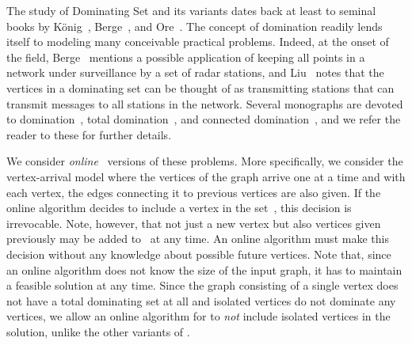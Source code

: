 The study of Dominating Set and its variants dates back at least to
seminal books by K\"{o}nig~\cite{K50}, Berge~\cite{B62}, and Ore~\cite{O62}.
The concept of domination readily lends itself to
modeling many conceivable practical problems.
Indeed, at the onset of the field,
Berge~\cite{B62} mentions a possible application of keeping all points in a
network under surveillance by a set of radar stations, and Liu~\cite{L68}
notes that the vertices in a dominating set can be thought
of as transmitting stations that can transmit messages to all stations
in the network. Several monographs are devoted to domination~\cite{HHS98},
total domination~\cite{HY13}, and connected domination~\cite{DW13}, and we
refer the reader to these for further details.

We consider \emph{online}~\cite{BE98b} versions of these problems.
More specifically, we consider the vertex-arrival model where the vertices
of the
graph arrive one at a time and with each vertex, the edges connecting
it to previous vertices are also given. 
If the online algorithm decides to include a vertex in the set~,
this decision is irrevocable.
Note, however, that not just a new vertex but also vertices given
previously may be added to~ at any time.
An online algorithm must make this decision without
any knowledge about possible future vertices.
Note that, since an online algorithm does not know the size of the
input graph, it has to maintain a feasible solution at any time.
Since the graph consisting of 
a single vertex does not have a total dominating set at all and
isolated vertices do not dominate any vertices, we allow an online 
algorithm for \tds to \emph{not} include isolated vertices in the solution, 
unlike the other variants of \ds.

